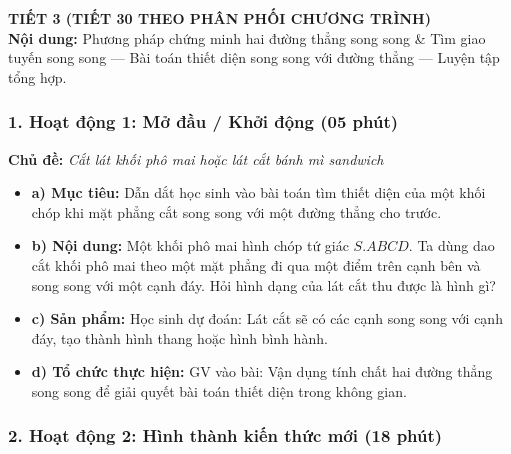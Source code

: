 \documentclass[12pt, a4paper]{article}
\begin{document}
\newpage

{\large \textbf{TIẾT 3 (TIẾT 30 THEO PHÂN PHỐI CHƯƠNG TRÌNH)}}\\[0.3em]
\textbf{Nội dung:} Phương pháp chứng minh hai đường thẳng song song \& Tìm giao tuyến song song --- Bài toán thiết diện song song với đường thẳng --- Luyện tập tổng hợp.

\subsubsection*{1. Hoạt động 1: Mở đầu / Khởi động (05 phút)}
\textbf{Chủ đề:} \textit{Cắt lát khối phô mai hoặc lát cắt bánh mì sandwich}
\begin{itemize}
    \item \textbf{a) Mục tiêu:} Dẫn dắt học sinh vào bài toán tìm thiết diện của một khối chóp khi mặt phẳng cắt song song với một đường thẳng cho trước.
    \item \textbf{b) Nội dung:} Một khối phô mai hình chóp tứ giác $S.ABCD$. Ta dùng dao cắt khối phô mai theo một mặt phẳng đi qua một điểm trên cạnh bên và song song với một cạnh đáy. Hỏi hình dạng của lát cắt thu được là hình gì?
    \item \textbf{c) Sản phẩm:} Học sinh dự đoán: Lát cắt sẽ có các cạnh song song với cạnh đáy, tạo thành hình thang hoặc hình bình hành.
    \item \textbf{d) Tổ chức thực hiện:} GV vào bài: Vận dụng tính chất hai đường thẳng song song để giải quyết bài toán thiết diện trong không gian.
\end{itemize}

\subsubsection*{2. Hoạt động 2: Hình thành kiến thức mới (18 phút)}
\end{document}

